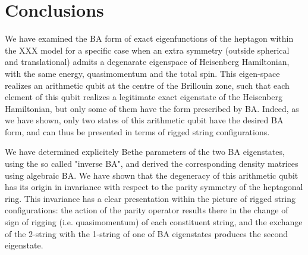 \documentclass{elsarticle}
\begin{document}
\section{Conclusions}
We have examined the BA form of exact eigenfunctions of the heptagon within the XXX model for a specific case when an extra symmetry (outside spherical and translational) admits a degenarate eigenspace of Heisenberg Hamiltonian, with the same energy, quasimomentum and the total spin. This eigen-space realizes an arithmetic qubit at the centre of the Brillouin zone, such that each element of this qubit realizes a legitimate exact eigenstate of the Heisenberg Hamiltonian, but only some of them have the form prescribed by BA. Indeed, as we have shown, only two states of this arithmetic qubit have the desired BA form, and can thus be presented in terms of rigged string configurations. 

We have determined explicitely Bethe parameters of the two BA eigenstates, using the so called "inverse BA", and derived the corresponding density matrices using algebraic BA. We have shown that the degeneracy of this arithmetic qubit has its origin in invariance with respect to the parity symmetry of the heptagonal ring. This invariance has a clear presentation within the picture of rigged string configurations: the action of the parity operator results there in the change of sign of rigging (i.e. quasimomentum) of each constituent string, and the exchange of the 2-string with the 1-string of one of BA eigenstates produces the second eigenstate. 


\newpage
\end{document}
